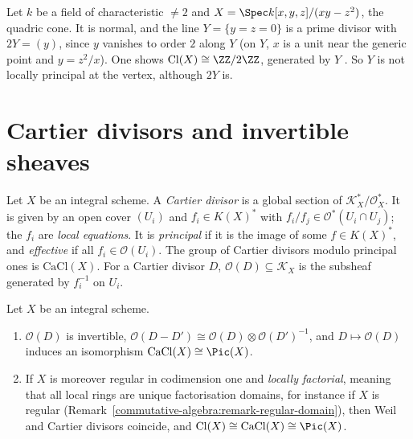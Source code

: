 \begin{example}\label{divisors:example-quadric-cone}
Let $k$ be a field of characteristic $\neq 2$ and $X = \Spec k[x, y, z]/(xy - z^2)$, the quadric cone. It is normal, and the line $Y = \{y = z = 0\}$ is a prime divisor with
$2Y = (y)$, since $y$ vanishes to order $2$ along $Y$ (on $Y$, $x$ is a unit near the generic point and $y = z^2/x$). One shows $\mathrm{Cl}(X) \cong \ZZ/2\ZZ$,
generated by $Y$ \cite[Example II.6.5.2]{hartshorne-ag}. So $Y$ is not locally principal at the vertex, although $2Y$ is.
\end{example}

\section{Cartier divisors and invertible sheaves}\label{divisors:section-cartier}

\begin{definition}\label{divisors:definition-cartier}
Let $X$ be an integral scheme. A \emph{Cartier divisor} is a global section of $\mathcal{K}_X^*/\mathcal{O}_X^*$. It is given by an open cover $(U_i)$ and
$f_i \in K(X)^*$ with $f_i/f_j \in \mathcal{O}^*(U_i \cap U_j)$; the $f_i$ are \emph{local equations}. It is \emph{principal} if it is the image of some
$f \in K(X)^*$, and \emph{effective} if all $f_i \in \mathcal{O}(U_i)$. The group of Cartier divisors modulo principal ones is $\mathrm{CaCl}(X)$. For a Cartier divisor
$D$, $\mathcal{O}(D) \subseteq \mathcal{K}_X$ is the subsheaf generated by $f_i^{-1}$ on $U_i$.
\end{definition}

\begin{proposition}\label{divisors:proposition-cartier-picard}
Let $X$ be an integral scheme.
\begin{enumerate}
\item $\mathcal{O}(D)$ is invertible, $\mathcal{O}(D - D') \cong \mathcal{O}(D) \otimes \mathcal{O}(D')^{-1}$, and $D \mapsto \mathcal{O}(D)$ induces an isomorphism
$\mathrm{CaCl}(X) \cong \Pic(X)$.
\item If $X$ is moreover regular in codimension one and \emph{locally factorial}, meaning that all local rings are unique factorisation domains, for instance if $X$ is
regular (Remark~\ref{commutative-algebra:remark-regular-domain}), then Weil and Cartier divisors coincide, and $\mathrm{Cl}(X) \cong \mathrm{CaCl}(X) \cong \Pic(X)$.
\end{enumerate}
\end{proposition}

